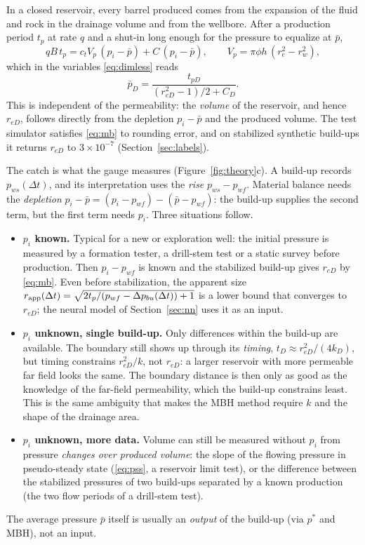 \documentclass[11pt]{article}
\newcommand{\reD}{r_{eD}}
\newcommand{\pb}{\bar p}
\begin{document}
In a closed reservoir, every barrel produced comes from the expansion of the fluid and rock in the drainage volume
and from the wellbore. After a production period $t_p$ at rate $q$ and a shut-in long enough for the pressure to
equalize at $\pb$,
\begin{equation}
  q B\, t_p = c_t V_p\,(p_i - \pb) + C\,(p_i - \pb), \qquad V_p = \pi\phi h\,(r_e^2 - r_w^2),
\end{equation}
which in the variables \eqref{eq:dimless} reads
\begin{equation}
  \pb_D = \frac{t_{pD}}{(\reD^2-1)/2 + C_D} .
  \label{eq:mb}
\end{equation}
This is independent of the permeability: the \emph{volume} of the reservoir, and hence $\reD$, follows directly
from the depletion $p_i - \pb$ and the produced volume. The test simulator satisfies \eqref{eq:mb} to rounding
error, and on stabilized synthetic build-ups it returns $\reD$ to $3\times10^{-7}$ (Section~\ref{sec:labels}).

The catch is what the gauge measures (Figure~\ref{fig:theory}c). A build-up records $p_{ws}(\Delta t)$, and its
interpretation uses the \emph{rise} $p_{ws} - p_{wf}$. Material balance needs the \emph{depletion}
$p_i - \pb = (p_i - p_{wf}) - (\pb - p_{wf})$: the build-up supplies the second term, but the first term needs
$p_i$. Three situations follow.

\begin{itemize}
  \item \textbf{$p_i$ known.} Typical for a new or exploration well: the initial pressure is measured by a
  formation tester, a drill-stem test or a static survey before production. Then $p_i - p_{wf}$ is known and the
  stabilized build-up gives $\reD$ by \eqref{eq:mb}. Even before stabilization, the apparent size
  $r_{\rm app}(\Delta t) = \sqrt{2 t_p/(p_{wf}-\Delta p_{bu}(\Delta t)) + 1}$ is a lower bound that converges to
  $\reD$; the neural model of Section~\ref{sec:nn} uses it as an input.
  \item \textbf{$p_i$ unknown, single build-up.} Only differences within the build-up are available. The boundary
  still shows up through its \emph{timing}, $t_D \approx \reD^2/(4k_D)$, but timing constrains
  $\reD^2/k$, not $\reD$: a larger reservoir with more permeable far field looks the same. The boundary distance is
  then only as good as the knowledge of the far-field permeability, which the build-up constrains least. This is
  the same ambiguity that makes the MBH method require $k$ and the shape of the drainage area.
  \item \textbf{$p_i$ unknown, more data.} Volume can still be measured without $p_i$ from pressure
  \emph{changes over produced volume}: the slope of the flowing pressure in pseudo-steady state
  (\eqref{eq:pss}, a reservoir limit test), or the difference between the stabilized pressures of two build-ups
  separated by a known production (the two flow periods of a drill-stem test).
\end{itemize}
The average pressure $\pb$ itself is usually an \emph{output} of the build-up (via $p^*$ and MBH), not an input.
\end{document}
